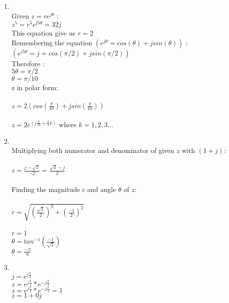 \documentclass[10pt,a4paper, margin=1in]{article}
\begin{document}
\begin{enumerate}
\begin{enumerate}
    \vspace{25}
    \item %
        \\ Given $z = re^{j\theta}$ :  
        \\$z^{5} = r^{5}e^{j5\theta} = 32j$
        \\ This equation give us $r=2$
        \\ Remembering the equation $(e^{j\theta} = cos(\theta) + jsin(\theta))$ : 
        \\$(e^{j5\theta} = j =  cos(\pi/2) + jsin(\pi/2))$
        \\ Therefore : 
        \\ $5\theta = \pi/2$
        \\ $\theta = \pi/10$
        \\ z in polar form:
        \\\\ $z = 2(cos(\frac{\pi}{10}) + jsin(\frac{\pi}{10}))$
        \\\\ $z = 2e^{(j{\frac{\pi}{10}} + \frac{\pi}{5}k)}$ where $k = 1,2,3...$
    \newpage
    \item %
        \\ Multiplying both numerator and denominator of given $z$ with $(1+j)$:
        \\\\ $z = \frac{j-\sqrt{3}}{-2} = \frac{\sqrt{3}-j}{2}$
        \\\\ Finding the magnitude r and angle $\theta$ of $z$:
        \\\\ $r = \sqrt{(\frac{\sqrt{3}}{2})^{2} + (\frac{-1}{2})^{2}} $
        \\\\ $r = 1$
        \\ $\theta = tan^{-1}(\frac{-1}{\sqrt{3}})$
        \\ $\theta = \frac{-\pi}{6}$
        \\
    \item %
        \\ $ j = e^{j\frac{\pi}{2}}$
        \\ $ z = e^{j\frac{\pi}{2}} * e^{-j\frac{\pi}{2}} $
        \\ $ z = e^{j\frac{\pi}{2}} * e^{-j\frac{\pi}{2}} = 1 $
        \\ $ z = 1 + 0j$ 
        \\
    \end{enumerate}
    

\end{enumerate}
\end{document}
